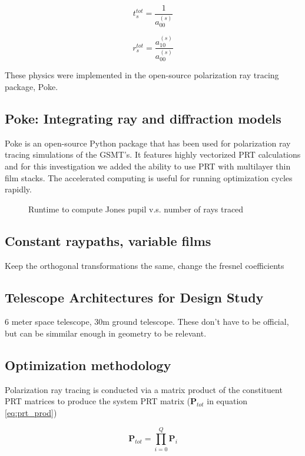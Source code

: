 \begin{equation}
    t_{s}^{tot} = \frac{1}{a_{00}^{(s)}}
\end{equation}

\begin{equation}
    r_{s}^{tot} = \frac{a_{10}^{(s)}}{a_{00}^{(s)}}
\end{equation}

These physics were implemented in the open-source polarization ray tracing package, Poke.

\subsection{Poke: Integrating ray and diffraction models}
Poke is an open-source Python package that has been used for polarization ray tracing simulations of the GSMT's. It features highly vectorized PRT calculations and for this investigation we added the ability to use PRT with multilayer thin film stacks. The accelerated computing is useful for running optimization cycles rapidly.

\begin{figure}
    \centering
    \caption{Runtime to compute Jones pupil v.s. number of rays traced}
    \label{fig:my_label}
\end{figure}

\subsection{Constant raypaths, variable films}
Keep the orthogonal transformations the same, change the fresnel coefficients

\subsection{Telescope Architectures for Design Study}
6 meter space telescope, 30m ground telescope. These don't have to be official, but can be simmilar enough in geometry to be relevant.

\subsection{Optimization methodology}
Polarization ray tracing is conducted via a matrix product of the constituent PRT matrices to produce the system PRT matrix ($\mathbf{P}_{tot}$ in equation \ref{eq:prt_prod})

\begin{equation}
    \mathbf{P}_{tot} = \prod_{i=0}^{Q} \mathbf{P}_{i}
    \label{eq:prt_prod}
\end{equation}


